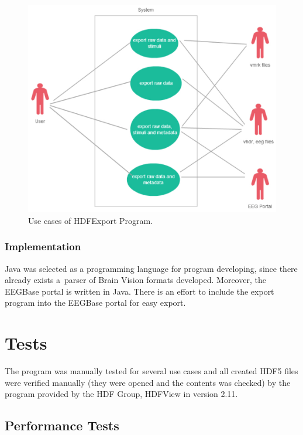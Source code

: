 \documentclass[conference]{IEEEtran}
\begin{document}
\begin{figure}
	\includegraphics[scale=0.5]{obrazky/use_case_data.pdf}	
	\caption{Use cases of HDFExport Program.}
	\label{use_case2}
\end{figure}


\subsubsection {Implementation}

Java was selected as a programming language for program developing, since there already exists a~parser of Brain Vision formats developed. Moreover, the EEGBase portal is written in Java. There is an effort to include the export program into the EEGBase portal for easy export.

\section{Tests}

The program was manually tested for several use cases and all created HDF5 files were verified manually (they were opened and the contents was checked) by the program provided by the HDF Group, HDFView \cite{hdfjava} in version 2.11. 

\subsection{Performance Tests}
\end{document}
